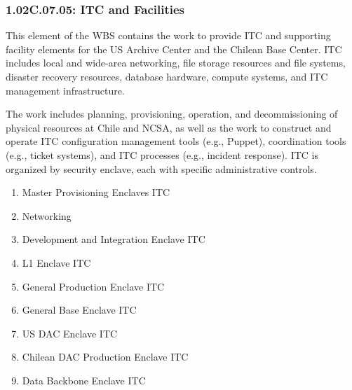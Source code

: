 \subsubsection{1.02C.07.05: ITC and Facilities}

This element of the WBS contains the work to provide ITC and supporting facility elements for the US Archive Center and the Chilean Base Center.
ITC includes local and wide-area networking, file storage resources and file systems, disaster recovery resources, database hardware, compute systems, and ITC management infrastructure.

The work includes planning, provisioning, operation, and decommissioning of physical resources at Chile and NCSA, as well as the work to construct and operate ITC configuration management tools (e.g., Puppet), coordination tools (e.g., ticket systems), and ITC processes (e.g., incident response).
ITC is organized by security enclave, each with specific administrative controls.

\begin{enumerate}

  \item{Master Provisioning Enclaves ITC}
  \item{Networking}
  \item{Development and Integration Enclave ITC}
  \item{L1 Enclave ITC}
  \item{General Production Enclave ITC}
  \item{General Base Enclave ITC}
  \item{US DAC Enclave ITC}
  \item{Chilean DAC Production Enclave ITC}
  \item{Data Backbone Enclave ITC}

\end{enumerate}
